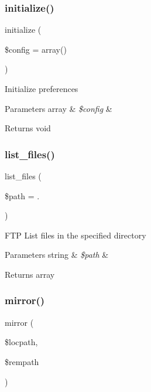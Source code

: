 \subsubsection{\texorpdfstring{initialize()}{initialize()}}
{\footnotesize\ttfamily initialize (\begin{DoxyParamCaption}\item[{}]{\$config = {\ttfamily array()} }\end{DoxyParamCaption})}

Initialize preferences


\begin{DoxyParams}[1]{Parameters}
array & {\em \$config} & \\
\hline
\end{DoxyParams}
\begin{DoxyReturn}{Returns}
void 
\end{DoxyReturn}
\mbox{\label{class_c_i___f_t_p_a2a40473caefcd36b60e3e96b3395975c}} 
\subsubsection{\texorpdfstring{list\+\_\+files()}{list\_files()}}
{\footnotesize\ttfamily list\+\_\+files (\begin{DoxyParamCaption}\item[{}]{\$path = {\ttfamily \textquotesingle{}.\textquotesingle{}} }\end{DoxyParamCaption})}

F\+TP List files in the specified directory


\begin{DoxyParams}[1]{Parameters}
string & {\em \$path} & \\
\hline
\end{DoxyParams}
\begin{DoxyReturn}{Returns}
array 
\end{DoxyReturn}
\mbox{\label{class_c_i___f_t_p_aea2de30bbdf050cb607bbc5a36772bf3}} 
\subsubsection{\texorpdfstring{mirror()}{mirror()}}
{\footnotesize\ttfamily mirror (\begin{DoxyParamCaption}\item[{}]{\$locpath,  }\item[{}]{\$rempath }\end{DoxyParamCaption})}

